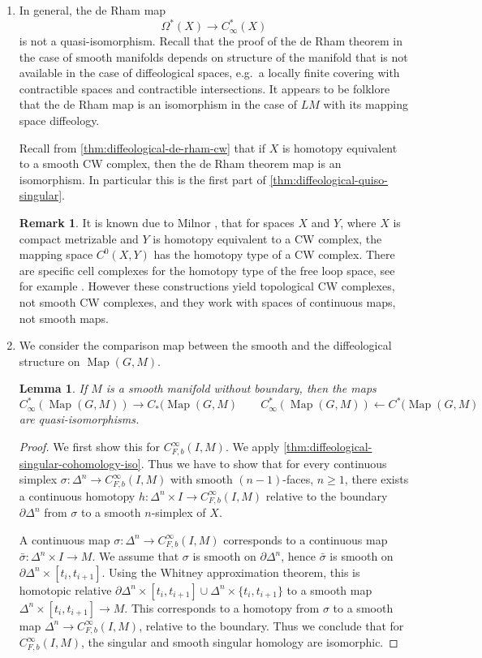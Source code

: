 \documentclass{scrartcl}
\theoremstyle{plain}
\newtheorem{lemma}[theorem]{Lemma}
\theoremstyle{definition}
\newtheorem{remark}[theorem]{Remark}
\newcommand{\from}{\leftarrow}
\DeclareMathOperator{\Map}{Map}
\begin{document}
\begin{enumerate}[(1)]
    \item In general, the de Rham map $$\Omega^*(X) \to C_\infty^*(X)$$ is not a quasi-isomorphism. Recall that the proof of the de Rham theorem in the case of smooth manifolds depends on structure of the manifold that is not available in the case of diffeological spaces, e.g.\ a locally finite covering with contractible spaces and contractible intersections. It appears to be folklore that the de Rham map is an isomorphism in the case of $LM$ with its mapping space diffeology. 

Recall from \cref{thm:diffeological-de-rham-cw} that if $X$ is homotopy equivalent to a smooth CW complex, then the de Rham theorem map is an isomorphism. In particular this is the first part of \cref{thm:diffeological-quiso-singular}.

\begin{remark}
    It is known due to Milnor \cite{milnor1959spaces}, that for spaces $X$ and $Y$, where $X$ is compact metrizable and $Y$ is homotopy equivalent to a CW complex, the mapping space $C^0(X, Y)$ has the homotopy type of a CW complex. There are specific cell complexes for the homotopy type of the free loop space, see for example \cite{rivera2018combinatorial}. However these constructions yield topological CW complexes, not smooth CW complexes, and they work with spaces of continuous maps, not smooth maps.
\end{remark}

\item We consider the comparison map between the smooth and the diffeological structure on $\Map(G, M)$.
\begin{lemma}\label{lemma:comparison-singular-smooth-cohomology}
    If $M$ is a smooth manifold without boundary, then the maps 
    $$C_\infty^*(\Map(G, M)) \to C_*(\Map(G, M) \qquad C_\infty^*(\Map(G, M)) \from C^*(\Map(G, M)$$ are quasi-isomorphisms.
\end{lemma}
\begin{proof}
    We first show this for $C^\infty_{F, b}(I, M)$. We apply \cref{thm:diffeological-singular-cohomology-iso}. Thus we have to show that for every continuous simplex $\sigma\colon \Delta^n\to C^\infty_{F, b}(I, M)$ with smooth $(n-1)$-faces, $n\geq 1$, there exists a continuous homotopy $h\colon \Delta^n\times I\to C^\infty_{F, b}(I, M)$ relative to the boundary $\partial\Delta^n$ from $\sigma$ to a smooth $n$-simplex of $X$.

    A continuous map $\sigma\colon\Delta^n\to C^\infty_{F, b}(I, M)$ corresponds to a continuous map $\bar \sigma \colon \Delta^n\times I\to M$. We assume that $\sigma$ is smooth on $\partial\Delta^n$, hence $\bar \sigma$ is smooth on $\partial\Delta^n\times [t_i, t_{i+1}]$. Using the Whitney approximation theorem, this is homotopic relative $\partial\Delta^n\times [t_i, t_{i+1}]\cup \Delta^n\times \{t_i, t_{i+1}\}$ to a smooth map $\Delta^n\times [t_i, t_{i+1}]\to M$. This corresponds to a homotopy from $\sigma$ to a smooth map $\Delta^n\to C^\infty_{F, b}(I, M)$, relative to the boundary. Thus we conclude that for $C^\infty_{F, b}(I, M)$, the singular and smooth singular homology are isomorphic.


\end{proof}
\end{enumerate}
\end{document}
